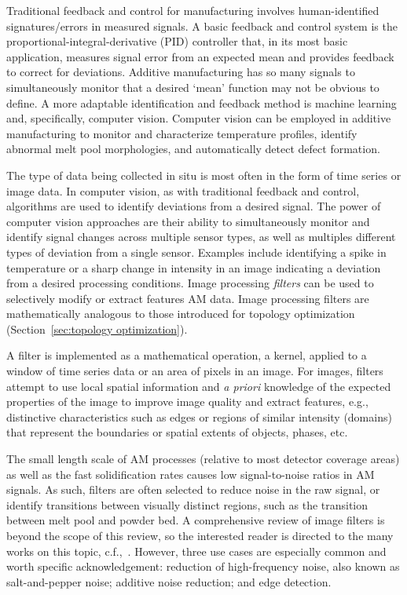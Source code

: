 Traditional feedback and control for manufacturing involves human-identified signatures/errors in measured signals. A basic feedback and control system is the proportional-integral-derivative (PID) controller that, in its most basic application, measures signal error from an expected mean and provides feedback to correct for deviations. Additive manufacturing has so many signals to simultaneously monitor that a desired `mean' function may not be obvious to define. A more adaptable identification and feedback method is machine learning and, specifically, computer vision. Computer vision can be employed in additive manufacturing to monitor and characterize temperature profiles, identify abnormal melt pool morphologies, and automatically detect defect formation. 

The type of data being collected in situ is most often in the form of time series or image data. In computer vision, as with traditional feedback and control, algorithms are used to identify deviations from a desired signal. The power of computer vision approaches are their ability to simultaneously monitor and identify signal changes across multiple sensor types, as well as multiples different types of deviation from a single sensor. Examples include identifying a spike in temperature or a sharp change in intensity in an image indicating a deviation from a desired processing conditions. Image processing \textit{filters} can be used to selectively modify or extract features AM data. Image processing filters are mathematically analogous to those introduced for topology optimization (Section~\ref{sec:topology optimization}).

A filter is implemented as a mathematical operation, a kernel, applied to a window of time series data or an area of pixels in an image. For images, filters attempt to use local spatial information and \textit{a priori} knowledge of the expected properties of the image to improve image quality and extract features, e.g., distinctive characteristics such as edges or regions of similar intensity (domains) that represent the boundaries or spatial extents of objects, phases, etc. 

The small length scale of AM processes (relative to most detector coverage areas) as well as the fast solidification rates causes low signal-to-noise ratios in AM signals. As such, filters are often selected to reduce noise in the raw signal, or identify transitions between visually distinct regions, such as the transition between melt pool and powder bed. A comprehensive review of image filters is beyond the scope of this review, so the interested reader is directed to the many works on this topic, c.f.,~\citet{Vernon1991}. However, three use cases are especially common and worth specific acknowledgement: reduction of high-frequency noise, also known as salt-and-pepper noise; additive noise reduction; and edge detection.


